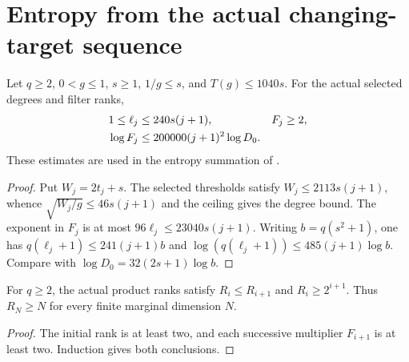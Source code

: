 \section{Entropy from the actual changing-target sequence}

\begin{lemma}
    \label{thm:aklv_sequence_entropy_cost}
    \leanok
    Let $q\ge2$, $0<g\le1$, $s\ge1$, $1/g\le s$, and
    $T(g)\le1040s$. For the actual selected degrees and filter ranks,
    \begin{align*}
        1\le\ell_j & \le240s(j+1),             & F_j & \ge2,\notag \\
        \log F_j   & \le200000(j+1)^2\log D_0.
    \end{align*}
    These estimates are used in the entropy summation of
    \cite[Section~6]{Arad2013AreaLaw}.
\end{lemma}
\begin{proof}
    \leanok
    Put $W_j=2t_j+s$. The selected thresholds satisfy
    $W_j\le2113s(j+1)$, whence
    $\sqrt{W_j/g}\le46s(j+1)$ and the ceiling gives the degree bound.
    The exponent in $F_j$ is at most $96\ell_j\le23040s(j+1)$.
    Writing $b=q(s^2+1)$, one has
    $q(\ell_j+1)\le241(j+1)b$ and
    $\log(q(\ell_j+1))\le485(j+1)\log b$.
    Compare with $\log D_0=32(2s+1)\log b$.
\end{proof}

\begin{lemma}
    \label{thm:aklv_sequence_rank_growth}
    \leanok
    For $q\ge2$, the actual product ranks satisfy
    $R_i\le R_{i+1}$ and $R_i\ge2^{i+1}$.
    Thus $R_N\ge N$ for every finite marginal dimension $N$.
\end{lemma}
\begin{proof}
    \leanok
    The initial rank is at least two, and each successive multiplier
    $F_{i+1}$ is at least two. Induction gives both conclusions.
\end{proof}

